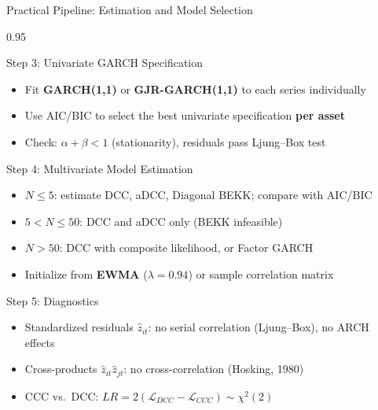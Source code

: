 \documentclass[9pt, aspectratio=169, t]{beamer}
\begin{document}
\begin{frame}{Practical Pipeline: Estimation and Model Selection}
    \begin{cminipage}{0.95\textwidth}
    \vspace{-2mm}
    {\scriptsize
    \begin{block}{Step 3: Univariate GARCH Specification}
        \begin{itemize}\setlength{\itemsep}{0pt}
            \item Fit \textbf{GARCH(1,1)} or \textbf{GJR-GARCH(1,1)} to each series individually
            \item Use AIC/BIC to select the best univariate specification \textbf{per asset}
            \item Check: $\alpha + \beta < 1$ (stationarity), residuals pass Ljung--Box test
        \end{itemize}
    \end{block}
    \vspace{-2mm}
    \begin{block}{Step 4: Multivariate Model Estimation}
        \begin{itemize}\setlength{\itemsep}{0pt}
            \item \textbf{$N \leq 5$}: estimate DCC, aDCC, Diagonal BEKK; compare with AIC/BIC
            \item \textbf{$5 < N \leq 50$}: DCC and aDCC only (BEKK infeasible)
            \item \textbf{$N > 50$}: DCC with composite likelihood, or Factor GARCH
            \item Initialize from \textbf{EWMA} ($\lambda = 0.94$) or sample correlation matrix
        \end{itemize}
    \end{block}
    \vspace{-2mm}
    \begin{block}{Step 5: Diagnostics}
        \begin{itemize}\setlength{\itemsep}{0pt}
            \item Standardized residuals $\hat{z}_{it}$: no serial correlation (Ljung--Box), no ARCH effects
            \item Cross-products $\hat{z}_{it}\hat{z}_{jt}$: no cross-correlation (Hosking, 1980)
            \item CCC vs.\ DCC: $LR = 2(\mathcal{L}_{DCC} - \mathcal{L}_{CCC}) \sim \chi^2(2)$
        \end{itemize}
    \end{block}
    }
    \end{cminipage}
\end{frame}
\end{document}
